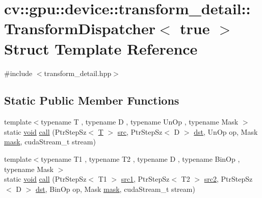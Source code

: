 \hypertarget{structcv_1_1gpu_1_1device_1_1transform__detail_1_1TransformDispatcher_3_01true_01_4}{\section{cv\-:\-:gpu\-:\-:device\-:\-:transform\-\_\-detail\-:\-:Transform\-Dispatcher$<$ true $>$ Struct Template Reference}
\label{structcv_1_1gpu_1_1device_1_1transform__detail_1_1TransformDispatcher_3_01true_01_4}
}


{\ttfamily \#include $<$transform\-\_\-detail.\-hpp$>$}

\subsection*{Static Public Member Functions}
\begin{DoxyCompactItemize}
\item 
{\footnotesize template$<$typename T , typename D , typename Un\-Op , typename Mask $>$ }\\static \hyperlink{legacy_8hpp_a8bb47f092d473522721002c86c13b94e}{void} \hyperlink{structcv_1_1gpu_1_1device_1_1transform__detail_1_1TransformDispatcher_3_01true_01_4_ad1b6fce4d1331079a79f6b202b5be31e}{call} (Ptr\-Step\-Sz$<$ \hyperlink{calib3d_8hpp_a3efb9551a871ddd0463079a808916717}{T} $>$ \hyperlink{legacy_8hpp_a371cd109b74033bc4366f584edd3dacc}{src}, Ptr\-Step\-Sz$<$ D $>$ \hyperlink{photo__c_8h_aed13e2a25279b24dc954073233fef7a5}{dst}, Un\-Op op, Mask \hyperlink{tracking_8hpp_a6b13ecd2fd6ec7ad422f1d7863c3ad19}{mask}, cuda\-Stream\-\_\-t stream)
\item 
{\footnotesize template$<$typename T1 , typename T2 , typename D , typename Bin\-Op , typename Mask $>$ }\\static \hyperlink{legacy_8hpp_a8bb47f092d473522721002c86c13b94e}{void} \hyperlink{structcv_1_1gpu_1_1device_1_1transform__detail_1_1TransformDispatcher_3_01true_01_4_a4c03e42f00cc1ed353fe9009363a6cea}{call} (Ptr\-Step\-Sz$<$ T1 $>$ \hyperlink{core__c_8h_a897de4702c922f4cccda0d57ccdcafb3}{src1}, Ptr\-Step\-Sz$<$ T2 $>$ \hyperlink{core__c_8h_a7561a36d48069d54a6c8ac4e4750edfd}{src2}, Ptr\-Step\-Sz$<$ D $>$ \hyperlink{photo__c_8h_aed13e2a25279b24dc954073233fef7a5}{dst}, Bin\-Op op, Mask \hyperlink{tracking_8hpp_a6b13ecd2fd6ec7ad422f1d7863c3ad19}{mask}, cuda\-Stream\-\_\-t stream)
\end{DoxyCompactItemize}


